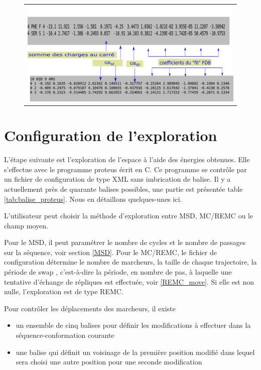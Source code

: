    \begin{figure}[!htbp]
     \centering
     \begin{tabular}{c}
       \includegraphics[width=12cm]{figure/inputenerGB.png} 
     \end{tabular}     
     \caption{}
\label{fig:GBenerfile}
   \end{figure}
   

\section{Configuration de l'exploration}

L'étape suivante est l'exploration de l'espace à l'aide des énergies obtenues. Elle s'effectue avec le programme proteus écrit en C. Ce programme se contrôle par un fichier de configuration de type XML sans imbrication de balise. Il y a actuellement près de quarante balises possibles, une partie est présentée table \ref{tab:balise_proteus}. Nous en détaillons quelques-unes ici.

L'utilisateur peut choisir la méthode d'exploration entre MSD, MC/REMC ou le champ moyen.

Pour le MSD, il peut paramétrer le nombre de cycles et le nombre de passages sur la séquence, voir section \ref{MSD}.
Pour le MC/REMC, le fichier de configuration détermine le nombre de marcheurs, la taille de chaque trajectoire, la période de \og swap \fg, c'est-à-dire la période, en nombre de pas, à laquelle une tentative d'échange de répliques est effectuée, voir \ref{REMC_move}. Si elle est non nulle, l'exploration est de type REMC.

Pour contrôler les déplacements des marcheurs, il existe 
\begin{itemize}
\item un ensemble de cinq  balises pour définir les modifications à effectuer dans la séquence-conformation courante
\item une balise qui définit un voisinage de la première position modifié dans lequel sera choisi une autre position pour une seconde modification
\end{itemize}

